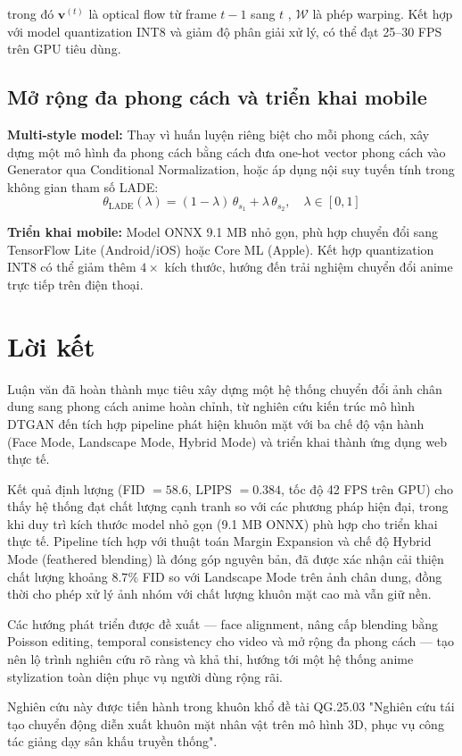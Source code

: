 trong đó $\mathbf{v}^{(t)}$ là optical flow từ frame $t-1$ sang $t$ \cite{Horn1981opticalflow}, $\mathcal{W}$ là phép warping. Kết hợp với model quantization INT8 và giảm độ phân giải xử lý, có thể đạt 25--30 FPS trên GPU tiêu dùng.

\subsection{Mở rộng đa phong cách và triển khai mobile}
\label{subsec:future_multistyle}

\textbf{Multi-style model:} Thay vì huấn luyện riêng biệt cho mỗi phong cách, xây dựng một mô hình đa phong cách bằng cách đưa one-hot vector phong cách vào Generator qua Conditional Normalization, hoặc áp dụng nội suy tuyến tính trong không gian tham số LADE:
\begin{equation}
\label{eq:style_interp}
\theta_{\text{LADE}}(\lambda) = (1-\lambda)\,\theta_{s_1} + \lambda\,\theta_{s_2}, \quad \lambda \in [0,1]
\end{equation}

\textbf{Triển khai mobile:} Model ONNX 9.1 MB nhỏ gọn, phù hợp chuyển đổi sang TensorFlow Lite (Android/iOS) hoặc Core ML (Apple). Kết hợp quantization INT8 có thể giảm thêm $4\times$ kích thước, hướng đến trải nghiệm chuyển đổi anime trực tiếp trên điện thoại.

\section{Lời kết}
\label{sec:final_word}

Luận văn đã hoàn thành mục tiêu xây dựng một hệ thống chuyển đổi ảnh chân dung sang phong cách anime hoàn chỉnh, từ nghiên cứu kiến trúc mô hình DTGAN đến tích hợp pipeline phát hiện khuôn mặt với ba chế độ vận hành (Face Mode, Landscape Mode, Hybrid Mode) và triển khai thành ứng dụng web thực tế.

Kết quả định lượng (FID $= 58.6$, LPIPS $= 0.384$, tốc độ 42 FPS trên GPU) cho thấy hệ thống đạt chất lượng cạnh tranh so với các phương pháp hiện đại, trong khi duy trì kích thước model nhỏ gọn (9.1 MB ONNX) phù hợp cho triển khai thực tế. Pipeline tích hợp với thuật toán Margin Expansion và chế độ Hybrid Mode (feathered blending) là đóng góp nguyên bản, đã được xác nhận cải thiện chất lượng khoảng $8.7\%$ FID so với Landscape Mode trên ảnh chân dung, đồng thời cho phép xử lý ảnh nhóm với chất lượng khuôn mặt cao mà vẫn giữ nền.

Các hướng phát triển được đề xuất — face alignment, nâng cấp blending bằng Poisson editing, temporal consistency cho video và mở rộng đa phong cách — tạo nên lộ trình nghiên cứu rõ ràng và khả thi, hướng tới một hệ thống anime stylization toàn diện phục vụ người dùng rộng rãi.

Nghiên cứu này được tiến hành trong khuôn khổ đề tài QG.25.03 "Nghiên cứu tái tạo chuyển động diễn xuất khuôn mặt nhân vật trên mô hình 3D, phục vụ công tác giảng dạy sân khấu truyền thống".
